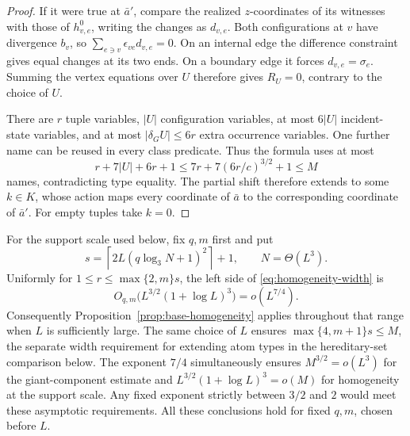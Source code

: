 \begin{proof}
If it were true at \(\bar a'\), compare the realized \(z\)-coordinates of
its witnesses with those of \(h_{v,e}^0\), writing the changes as
\(d_{v,e}\).  Both configurations at \(v\) have divergence \(b_v\), so
\(\sum_{e\ni v}\epsilon_{ve}d_{v,e}=0\).  On an internal edge the difference
constraint gives equal changes at its two ends.  On a boundary edge it
forces \(d_{v,e}=\sigma_e\).  Summing the vertex equations over \(U\)
therefore gives \(R_U=0\), contrary to the choice of \(U\).

There are \(r\) tuple variables, \(|U|\) configuration variables, at most
\(6|U|\) incident-state variables, and at most \(|\delta_GU|\le6r\) extra
occurrence variables.  One further name can be reused in every class
predicate.  Thus the formula uses at most
\[
 r+7|U|+6r+1\le7r+7(6r/c)^{3/2}+1\le M
\]
names, contradicting type equality.  The partial shift therefore extends
to some \(k\in K\), whose action maps every coordinate of \(\bar a\) to the
corresponding coordinate of \(\bar a'\).  For empty tuples take \(k=0\).
\end{proof}

For the support scale used below, fix \(q,m\) first and put
\[
 s=\left\lceil2L(q\log_3 N+1)^2\right\rceil+1,
 \qquad N=\Theta(L^3).
\]
Uniformly for \(1\le r\le\max\{2,m\}s\), the left side of
\eqref{eq:homogeneity-width} is
\[
 O_{q,m}\bigl(L^{3/2}(1+\log L)^3\bigr)=o(L^{7/4}).
\]
Consequently Proposition~\ref{prop:base-homogeneity} applies throughout
that range when \(L\) is sufficiently large. The same choice of \(L\)
ensures \(\max\{4,m+1\}s\le M\), the separate width requirement for
extending atom types in the hereditary-set comparison below.
The exponent \(7/4\) simultaneously ensures \(M^{3/2}=o(L^3)\) for the
giant-component estimate and \(L^{3/2}(1+\log L)^3=o(M)\) for homogeneity
at the support scale. Any fixed exponent strictly between
\(3/2\) and \(2\) would meet these asymptotic requirements.
All these conclusions hold for fixed \(q,m\), chosen before \(L\).
